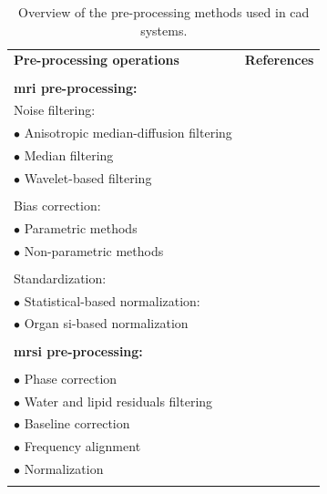 \begin{table}
  \caption{Overview of the pre-processing methods used in \acs*{cad} systems.}
  \scriptsize
  \centering
  \begin{tabular}{l r}
    \toprule
    \textbf{Pre-processing operations} & \textbf{References} \\ \\ [-1.5ex]
    \midrule
    \textbf{\ac{mri} pre-processing:} & \\
    \quad Noise filtering: &  \\
    \quad \quad $\bullet$ Anisotropic median-diffusion filtering & \cite{rampun2015classifying,rampun2016computer,rampun2016computerb,rampun2016quantitative}  \\
    \quad \quad $\bullet$ Median filtering & \cite{Ozer2009,Ozer2010}  \\
    \quad \quad $\bullet$ Wavelet-based filtering & \cite{Ampeliotis2007,Ampeliotis2008,Lopes2011} \\ \\ [-1.5ex]
    \quad Bias correction: & \\
    \quad \quad $\bullet$ Parametric methods & \cite{Lv2009,Viswanath2009} \\
    \quad \quad $\bullet$ Non-parametric methods & \cite{Viswanath2011} \\ \\ [-1.5ex]
    \quad Standardization: & \\
    \quad \quad $\bullet$ Statistical-based normalization: & \cite{Artan2009,Artan2010,Lv2009,Ozer2009,Ozer2010,Viswanath2009,Viswanath2011,Viswanath2012} \\
    \quad \quad $\bullet$ Organ \ac{si}-based normalization & \cite{Niaf2011,Niaf2012,lehaire2014computer,samarasinghe2016semi} \\ \\ [-1.5ex]
    \textbf{\ac{mrsi} pre-processing:} & \\ \\ [-1.5ex]
    \quad $\bullet$ Phase correction & \cite{Parfait2012,trigui2016classification,trigui2017automatic} \\
    \quad $\bullet$ Water and lipid residuals filtering & \cite{Kelm2007} \\
    \quad $\bullet$ Baseline correction & \cite{Parfait2012,Tiwari2012,trigui2016classification,trigui2017automatic} \\
    \quad $\bullet$ Frequency alignment & \cite{Tiwari2012,trigui2016classification,trigui2017automatic} \\
    \quad $\bullet$ Normalization & \cite{Parfait2012,trigui2016classification,trigui2017automatic} \\ \\ [-1.5ex]
    \bottomrule
  \end{tabular}
\label{tab:summary-preproc}
\end{table}
